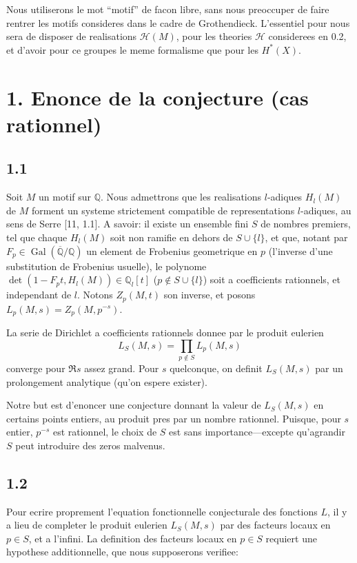 \documentclass[12pt,a4paper]{article}
\theoremstyle{plain}
\theoremstyle{definition}
\theoremstyle{remark}
\DeclareMathOperator{\Gal}{Gal}
\newcommand{\Q}{\mathbb{Q}}
\begin{document}
Nous utiliserons le mot ``motif'' de facon libre, sans nous preoccuper de faire rentrer
les motifs consideres dans le cadre de Grothendieck. L'essentiel pour nous sera de
disposer de realisations $\mathcal{H}(M)$, pour les theories $\mathcal{H}$ considerees en 0.2, et d'avoir pour
ce groupes le meme formalisme que pour les $H^*(X)$.


\section*{1. Enonce de la conjecture (cas rationnel)}

\subsection*{1.1}

Soit $M$ un motif sur $\Q$. Nous admettrons que les realisations $l$-adiques $H_l(M)$ de $M$
forment un systeme strictement compatible de representations $l$-adiques, au sens de
Serre [11, 1.1]. A savoir: il existe un ensemble fini $S$ de nombres premiers, tel que
chaque $H_l(M)$ soit non ramifie en dehors de $S \cup \{l\}$, et que, notant par
$F_p \in \Gal(\overline{\Q}/\Q)$ un element de Frobenius geometrique en $p$ (l'inverse d'une
substitution de Frobenius usuelle), le polynome $\det(1 - F_p t, H_l(M)) \in \Q_l[t]$
($p \notin S \cup \{l\}$) soit a coefficients rationnels, et independant de $l$. Notons
$Z_p(M, t)$ son inverse, et posons $L_p(M, s) = Z_p(M, p^{-s})$.

La serie de Dirichlet a coefficients rationnels donnee par le produit eulerien
\[
L_S(M, s) = \prod_{p \notin S} L_p(M, s)
\]
converge pour $\Re s$ assez grand. Pour $s$ quelconque, on definit $L_S(M, s)$ par un
prolongement analytique (qu'on espere exister).

Notre but est d'enoncer une conjecture donnant la valeur de $L_S(M, s)$ en certains
points entiers, au produit pres par un nombre rationnel. Puisque, pour $s$ entier,
$p^{-s}$ est rationnel, le choix de $S$ est sans importance---excepte qu'agrandir $S$ peut
introduire des zeros malvenus.

\subsection*{1.2}

Pour ecrire proprement l'equation fonctionnelle conjecturale des fonctions $L$, il y a
lieu de completer le produit eulerien $L_S(M, s)$ par des facteurs locaux en $p \in S$,
et a l'infini. La definition des facteurs locaux en $p \in S$ requiert une hypothese
additionnelle, que nous supposerons verifiee:
\end{document}

